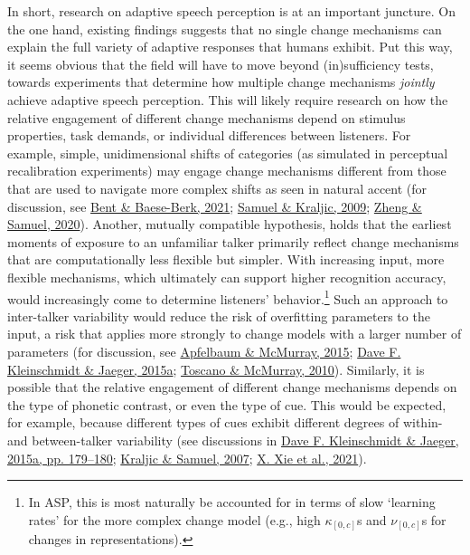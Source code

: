 \documentclass[
  11pt,
  english,
  man,floatsintext]{apa6}
\begin{document}
In short, research on adaptive speech perception is at an important juncture. On the one hand, existing findings suggests that no single change mechanisms can explain the full variety of adaptive responses that humans exhibit. Put this way, it seems obvious that the field will have to move beyond (in)sufficiency tests, towards experiments that determine how multiple change mechanisms \emph{jointly} achieve adaptive speech perception. This will likely require research on how the relative engagement of different change mechanisms depend on stimulus properties, task demands, or individual differences between listeners. For example, simple, unidimensional shifts of categories (as simulated in perceptual recalibration experiments) may engage change mechanisms different from those that are used to navigate more complex shifts as seen in natural accent (for discussion, see \protect\hyperlink{ref-bent-baeseberk2021}{Bent \& Baese-Berk, 2021}; \protect\hyperlink{ref-samuel-kraljic2009}{Samuel \& Kraljic, 2009}; \protect\hyperlink{ref-zheng-samuel2020}{Zheng \& Samuel, 2020}). Another, mutually compatible hypothesis, holds that the earliest moments of exposure to an unfamiliar talker primarily reflect change mechanisms that are computationally less flexible but simpler. With increasing input, more flexible mechanisms, which ultimately can support higher recognition accuracy, would increasingly come to determine listeners' behavior.\footnote{In ASP, this is most naturally be accounted for in terms of slow `learning rates' for the more complex change model (e.g., high \(\kappa_[0,c]\)s and \(\nu_[0,c]\)s for changes in representations).} Such an approach to inter-talker variability would reduce the risk of overfitting parameters to the input, a risk that applies more strongly to change models with a larger number of parameters (for discussion, see \protect\hyperlink{ref-apfelbaum-mcmurray2015}{Apfelbaum \& McMurray, 2015}; \protect\hyperlink{ref-kleinschmidt-jaeger2015}{Dave F. Kleinschmidt \& Jaeger, 2015a}; \protect\hyperlink{ref-toscano-mcmurray2010}{Toscano \& McMurray, 2010}). Similarly, it is possible that the relative engagement of different change mechanisms depends on the type of phonetic contrast, or even the type of cue. This would be expected, for example, because different types of cues exhibit different degrees of within- and between-talker variability (see discussions in \protect\hyperlink{ref-kleinschmidt-jaeger2015}{Dave F. Kleinschmidt \& Jaeger, 2015a, pp. 179--180}; \protect\hyperlink{ref-kraljic-samuel2007}{Kraljic \& Samuel, 2007}; \protect\hyperlink{ref-xie2021cognition}{X. Xie et al., 2021}).
\end{document}
